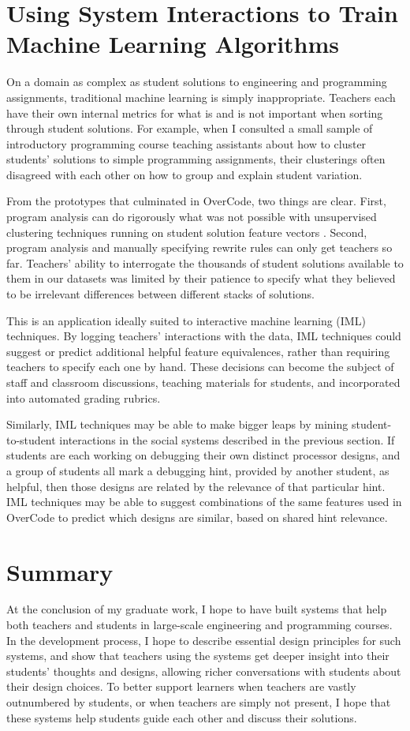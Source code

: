 \documentclass{sigchi}
\begin{document}
\section{Using System Interactions to Train Machine Learning Algorithms}

On a domain as complex as student solutions to engineering and programming assignments, traditional machine learning is simply inappropriate. Teachers each have their own internal metrics for what is and is not important when sorting through student solutions. For example, when I consulted a small sample of introductory programming course teaching assistants about how to cluster students' solutions to simple programming assignments, their clusterings often disagreed with each other on how to group and explain student variation.

From the prototypes that culminated in OverCode, two things are clear. First, program analysis can do rigorously what was not possible with unsupervised clustering techniques running on student solution feature vectors \cite{GlassmanCHIWkshop}. Second, program analysis and manually specifying rewrite rules can only get teachers so far. Teachers' ability to interrogate the thousands of student solutions available to them in our datasets was limited by their patience to specify what they believed to be irrelevant differences between different stacks of solutions. 

This is an application ideally suited to interactive machine learning (IML) techniques. By logging teachers' interactions with the data, IML techniques could suggest or predict additional helpful feature equivalences, rather than requiring teachers to specify each one by hand. These decisions can become the subject of staff and classroom discussions, teaching materials for students, and incorporated into automated grading rubrics. 

Similarly, IML techniques may be able to make bigger leaps by mining student-to-student interactions in the social systems described in the previous section. If students are each working on debugging their own distinct processor designs, and a group of students all mark a debugging hint, provided by another student, as helpful, then those designs are related by the relevance of that particular hint. IML techniques may be able to suggest combinations of the same features used in OverCode to predict which designs are similar, based on shared hint relevance.

\section{Summary}
At the conclusion of my graduate work, I hope to have built systems that help both teachers and students in large-scale engineering and programming courses. In the development process, I hope to describe essential design principles for such systems, and show that teachers using the systems get deeper insight into their students' thoughts and designs, allowing richer conversations with students about their design choices. To better support learners when teachers are vastly outnumbered by students, or when teachers are simply not present, I hope that these systems help students guide each other and discuss their solutions.
\end{document}
